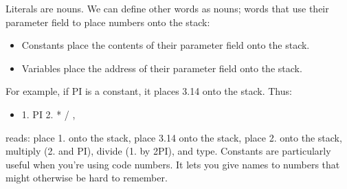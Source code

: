 \documentclass[b5paper, oneside]{book}
\begin{document}
Literals are nouns. We can define other words as nouns; words that use their parameter field to place numbers onto the stack:\begin{itemize}
   \item Constants place the contents of their parameter field onto the stack.
   \item Variables place the address of their parameter field onto the stack.\end{itemize}
For example, if PI is a constant, it places 3.14 onto the stack. Thus:\begin{itemize}
   \item 1. PI 2. * / ,\end{itemize}
reads: place 1. onto the stack, place 3.14 onto the stack, place 2. onto the stack, multiply (2. and PI), divide (1. by 2PI), and type. Constants are particularly useful when you're using code numbers. It lets you give names to numbers that might otherwise be hard to remember.
\end{document}
